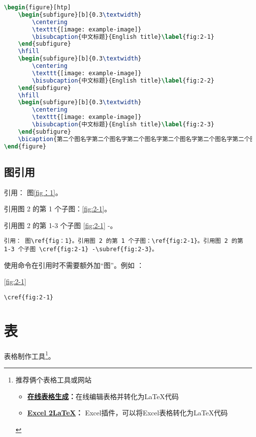 \begin{lstlisting}[language=TeX]
\begin{figure}[htp]
	\begin{subfigure}[b]{0.3\textwidth}
		\centering
		\texttt{[image: example-image]}
		\bisubcaption{中文标题}{English title}\label{fig:2-1}
	\end{subfigure}
	\hfill
	\begin{subfigure}[b]{0.3\textwidth}
		\centering
		\texttt{[image: example-image]}
		\bisubcaption{中文标题}{English title}\label{fig:2-2}
	\end{subfigure}
	\hfill
	\begin{subfigure}[b]{0.3\textwidth}
		\centering
		\texttt{[image: example-image]}
		\bisubcaption{中文标题}{English title}\label{fig:2-3}
	\end{subfigure}
	\bicaption{第二个图名字第二个图名字第二个图名字第二个图名字第二个图名字第二个图名字第二个图名字第二个图名字第二个图名字第二个图名字}{English title}\label{fig:2}
\end{figure}
\end{lstlisting}

\subsection{图引用}
引用： 图\ref{fig：1}。

引用图 2 的第 1 个子图：\ref{fig:2-1}。
 
引用图 2 的第 1-3 个子图 \cref{fig:2-1} -。

\begin{lstlisting}
引用： 图\ref{fig：1}。引用图 2 的第 1 个子图：\ref{fig:2-1}。引用图 2 的第 1-3 个子图 \cref{fig:2-1} -\subref{fig:2-3}。
\end{lstlisting}
使用\myverb{\cref{}}命令在引用时不需要额外加“图”。例如 ：

\cref{fig:2-1}

\begin{lstlisting}
\cref{fig:2-1}
\end{lstlisting}

\section{表}
表格制作工具\footnote{推荐俩个表格工具或网站\begin{itemize}
		\item \textbf{\href{www.tablesgenerator.com}{在线表格生成}\;：}在线编辑表格并转化为\LaTeX 代码
		\item \textbf{\href{https://www.ctan.org/tex-archive/support/excel2latex/}{Excel 2\LaTeX}\;：
		}Excel插件，可以将Excel表格转化为\LaTeX 代码
\end{itemize}}。
